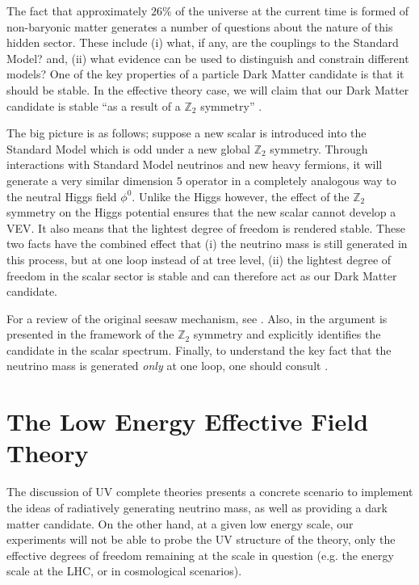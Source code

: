 \documentclass[11pt]{article}
\numberwithin{equation}{section}
\numberwithin{figure}{section}
\numberwithin{table}{section}
\begin{document}
The fact that approximately $26$\% \cite{Planck} of the universe at the current time is formed of non-baryonic matter generates a number of questions about the nature of this hidden sector. These include (i) what, if any, are the couplings to the Standard Model? and, (ii) what evidence can be used to distinguish and constrain different models? One of the key properties of a particle Dark Matter candidate is that it should be stable. In the effective theory case, we will claim that our Dark Matter candidate is stable ``as a result of a $\mathbb{Z}_2$ symmetry'' \cite{Ma2006a, Kubo2006, Ma2006, Ma2001}.

The big picture is as follows; suppose a new scalar is introduced into the Standard Model which is odd under a new global $\mathbb{Z}_2$ symmetry. Through interactions with Standard Model neutrinos and new heavy fermions, it will generate a very similar dimension $5$ operator in a completely analogous way to the neutral Higgs field $\phi^0$. Unlike the Higgs however, the effect of the $\mathbb{Z}_2$ symmetry on the Higgs potential ensures that the new scalar cannot develop a VEV. It also means that the lightest degree of freedom is rendered stable. These two facts have the combined effect that (i) the neutrino mass is still generated in this process, but at one loop instead of at tree level, (ii) the lightest degree of freedom in the scalar sector is stable and can therefore act as our Dark Matter candidate.

For a review of the original seesaw mechanism, see \cite{Ma1998,Ma2001,Ma2006a}. Also, in \cite{Ma2006a} the argument is presented in the framework of the $\mathbb{Z}_2$ symmetry and explicitly identifies the candidate in the scalar spectrum. Finally, to understand the key fact that the neutrino mass is generated \emph{only} at one loop, one should consult \cite{Ma2006}.




\section{The Low Energy Effective Field Theory}\label{sec:low energy theory}

The discussion of UV complete theories \cite{Farzan2009, Farzan2010, Farzan2010a} presents a concrete scenario to implement the ideas of radiatively generating neutrino mass, as well as providing a dark matter candidate. On the other hand, at a given low energy scale, our experiments will not be able to probe the UV structure of the theory, only the effective degrees of freedom remaining at the scale in question (e.g. the energy scale at the LHC, or in cosmological scenarios).
\end{document}
